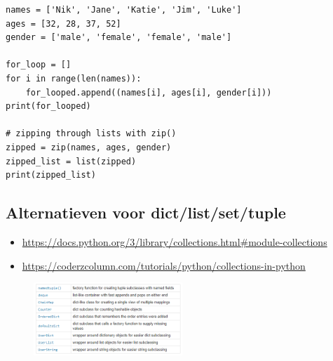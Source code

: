 \documentclass{article}
\begin{document}
\begin{verbatim}
names = ['Nik', 'Jane', 'Katie', 'Jim', 'Luke']
ages = [32, 28, 37, 52]
gender = ['male', 'female', 'female', 'male']

for_loop = []
for i in range(len(names)):
    for_looped.append((names[i], ages[i], gender[i]))
print(for_looped)

# zipping through lists with zip()
zipped = zip(names, ages, gender)
zipped_list = list(zipped)
print(zipped_list)
\end{verbatim}

\subsection{Alternatieven voor dict/list/set/tuple}

\begin{itemize}
    \item \url{https://docs.python.org/3/library/collections.html#module-collections}
    \item \url{https://coderzcolumn.com/tutorials/python/collections-in-python}
\end{itemize}


\begin{figure}[H]
    \centering
    \includegraphics[width=0.5\textwidth]{collections.png}
    \caption{}
\end{figure}
\end{document}
